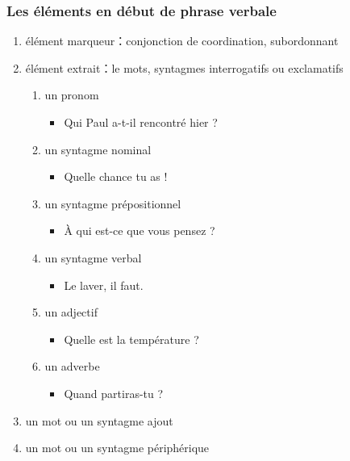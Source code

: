 \documentclass[UTF8]{report}
\begin{document}
\subsubsection{Les éléments en début de phrase verbale}
\begin{enumerate}
    \item élément marqueur：conjonction de coordination, subordonnant
    \item élément extrait：le mots, syntagmes interrogatifs ou exclamatifs
    \begin{enumerate}
        \item un pronom
        \begin{itemize}
            \item Qui Paul a-t-il rencontré hier ?
        \end{itemize}
        \item un syntagme nominal
        \begin{itemize}
            \item Quelle chance tu as !
        \end{itemize}
        \item un syntagme prépositionnel 
        \begin{itemize}
            \item À qui est-ce que vous pensez ?
        \end{itemize}
        \item un syntagme verbal
        \begin{itemize}
            \item Le laver, il faut.
        \end{itemize}
        \item un adjectif
        \begin{itemize}
            \item Quelle est la température ?
        \end{itemize}
        \item un adverbe
        \begin{itemize}
            \item Quand partiras-tu ?
        \end{itemize}
    \end{enumerate}
    \item un mot ou un syntagme ajout
    \item un mot ou un syntagme périphérique
    \begin{enumerate}

\end{enumerate}
\end{enumerate}
\end{document}
